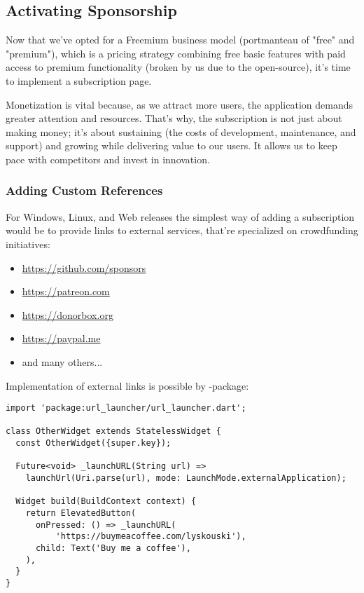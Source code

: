 
\subsection{Activating Sponsorship}

Now that we've opted for a Freemium business model (portmanteau of "free" and "premium"), which is a pricing strategy 
combining free basic features with paid access to premium functionality (broken by us due to the open-source), it's 
time to implement a subscription page. 

Monetization is vital because, as we attract more users, the application demands greater attention and resources.
That's why, the subscription is not just about making money; it's about sustaining (the costs of development, 
maintenance, and support) and growing while delivering value to our users. It allows us to keep pace with competitors 
and invest in innovation.


\subsubsection{Adding Custom References}

For Windows, Linux, and Web releases the simplest way of adding a subscription would be to provide links to external 
services, that're specialized on crowdfunding initiatives:

\begin{itemize}
  \item  \href{https://github.com/sponsors}{https://github.com/sponsors}
  \item  \href{https://patreon.com}{https://patreon.com}
  \item  \href{https://donorbox.org}{https://donorbox.org}
  \item  \href{https://paypal.me}{https://paypal.me}
  \item  and many others...
\end{itemize}

\noindent Implementation of external links is possible by -package:

\begin{lstlisting}
import 'package:url_launcher/url_launcher.dart';

class OtherWidget extends StatelessWidget {
  const OtherWidget({super.key});

  Future<void> _launchURL(String url) =>
    launchUrl(Uri.parse(url), mode: LaunchMode.externalApplication);

  Widget build(BuildContext context) {
    return ElevatedButton(
      onPressed: () => _launchURL(
          'https://buymeacoffee.com/lyskouski'),
      child: Text('Buy me a coffee'),
    ),
  }
}
\end{lstlisting}


